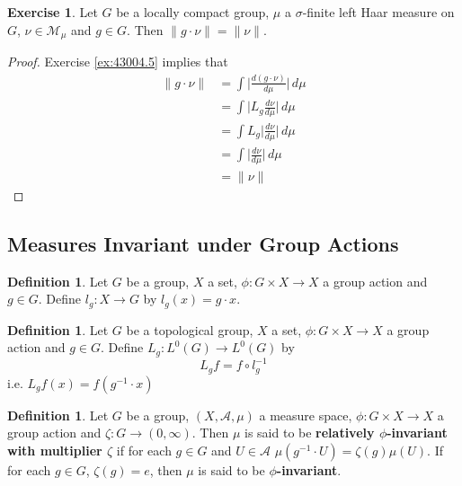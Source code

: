 \documentclass[12pt]{amsart}
\theoremstyle{definition}
\newtheorem{defn}[definition]{Definition}
\newtheorem{ex}[definition]{Exercise}
\newcommand{\sig}{\sigma}
\newcommand{\MA}{\mathcal{A}}
\newcommand{\MM}{\mathcal{M}}
\newcommand{\dmu}{\, d \mu}
\newcommand{\ld}[1]{\label{defn:#1}}
\newcommand{\rex}[1]{Exercise \ref{ex:#1}}
\begin{document}
	\begin{ex}
	Let $G$ be a locally compact group, $\mu$ a $\sig$-finite left Haar measure on $G$, $\nu \in \MM_{\mu}$ and $g \in G$. Then $\|g \cdot \nu\| = \|\nu\|$. 
	\end{ex}
	
	\begin{proof}
	\rex{43004.5} implies that
	\begin{align*}
	\|g \cdot \nu\| 
	&= \int \bigg | \frac{d (g \cdot \nu)}{d\mu} \bigg | \dmu \\
	&=  \int \bigg | L_g \frac{d \nu}{d\mu} \bigg | \dmu \\
	&= \int L_g \bigg | \frac{d \nu}{d\mu} \bigg | \dmu \\
	&= \int \bigg | \frac{d \nu}{d\mu} \bigg | \dmu \\
	&= \|\nu\|
	\end{align*}
	\end{proof}

	
	
	
	
	
	
	
	
	
	
	
	
	
	
	
	
	
	
	
	
	\newpage
	\subsection{Measures Invariant under Group Actions}
	\begin{defn} \ld{00000} 
		Let $G$ be a group, $X$ a set, $\phi: G \times X \rightarrow X$ a group action and $g \in G$. Define $l_g:X \rightarrow G$ by $l_g(x) = g \cdot x$. 
	\end{defn}
	
	\begin{defn} \ld{00000} 
		Let $G$ be a topological group, $X$ a set, $\phi: G \times X \rightarrow X$ a group action and $g \in G$. Define $L_g: L^0(G) \rightarrow L^0(G)$ by 
		$$L_g f = f \circ l_g^{-1}$$ 
		i.e. $L_g f(x) = f(g^{-1} \cdot x)$
	\end{defn}

	\begin{defn}
		Let $G$ be a group, $(X, \MA, \mu)$ a measure space, $\phi: G \times X \rightarrow X$ a group action and $\zeta: G \rightarrow (0, \infty)$. Then $\mu$ is said to be \textbf{relatively $\phi$-invariant with multiplier $\zeta$} if for each $g \in G$ and $U \in \MA$ $\mu(g^{-1} \cdot U) = \zeta(g) \mu(U)$. If for each $g \in G$, $\zeta(g) = e$, then $\mu$ is said to be \textbf{$\phi$-invariant}.
	\end{defn}
\end{document}
